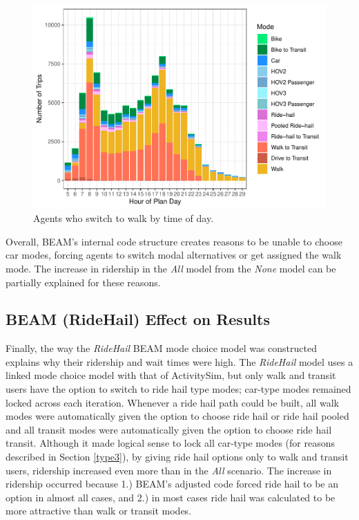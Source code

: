 \documentclass[12pt, oneside, openright]{byuthesis}
\begin{document}
\begin{figure}

{\centering \includegraphics{thesis_files/figure-latex/walkers-1} 

}

\caption{Agents who switch to walk by time of day.}\label{fig:walkers}
\end{figure}

Overall, BEAM's internal code structure creates reasons to be unable to choose car modes, forcing agents to switch modal alternatives or get assigned the walk mode. The increase in ridership in the \emph{All} model from the \emph{None} model can be partially explained for these reasons.

\hypertarget{type2}{%
\subsection{BEAM (RideHail) Effect on Results}\label{type2}}

Finally, the way the \emph{RideHail} BEAM mode choice model was constructed explains why their ridership and wait times were high. The \emph{RideHail} model uses a linked mode choice model with that of ActivitySim, but only walk and transit users have the option to switch to ride hail type modes; car-type modes remained locked across each iteration. Whenever a ride hail path could be built, all walk modes were automatically given the option to choose ride hail or ride hail pooled and all transit modes were automatically given the option to choose ride hail transit. Although it made logical sense to lock all car-type modes (for reasons described in Section \ref{type3}), by giving ride hail options only to walk and transit users, ridership increased even more than in the \emph{All} scenario. The increase in ridership occurred because 1.) BEAM's adjusted code forced ride hail to be an option in almost all cases, and 2.) in most cases ride hail was calculated to be more attractive than walk or transit modes.
\end{document}
